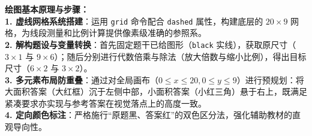 \vspace{0.6cm}

{\small\color{blue!70!black}
\textbf{绘图基本原理与步骤：}\\
\textbf{1. 虚线网格系统搭建}：运用 \texttt{grid} 命令配合 \texttt{dashed} 属性，构建底层的 $20 \times 9$ 网格，为线段测量和比例计算提供像素级准确的参照系。\\
\textbf{2. 解构题设与变量转换}：首先固定题干已给图形（\texttt{black} 实线），获取原尺寸（$3\times 1$ 与 $9\times 6$）；随后分别进行代数倍乘与除法（放大倍数与缩小比例），得出目标尺寸（$6\times 2$ 与 $3\times 2$）。\\
\textbf{3. 多元素布局防重叠}：通过对全局画布（$0 \le x \le 20, 0 \le y \le 9$）进行预规划：将大面积答案（大红框）沉于左侧中部，小面积答案（小红三角）悬于右上，既满足紧凑要求亦实现与参考答案在视觉落点上的高度一致。\\
\textbf{4. 定向颜色标注}：严格施行“原题黑、答案红”的双色区分法，强化辅助教材的直观导向性。
}

\newpage
